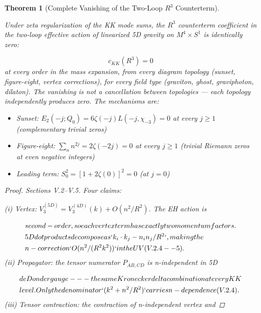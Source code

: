 \documentclass[aps,prd,preprint,superscriptaddress,longbibliography,floatfix]{revtex4-2}
\newtheorem{theorem}{Theorem}[section]
\theoremstyle{remark}
\begin{document}
\begin{theorem}[Complete Vanishing of the Two-Loop $R^{3}$ Counterterm]
\label{thm:V1}

\textit{Under zeta regularization of the KK mode sums, the $R^{3}$ counterterm coefficient in the two-loop effective action of linearized 5D gravity on $M^{4} \times S^{1}$ is identically zero:}


\begin{equation}
    c_{KK}(R^{3}) = 0
\end{equation}
\textit{at every order in the mass expansion, from every diagram topology (sunset, figure-eight, vertex corrections), for every field type (graviton, ghost, graviphoton, dilaton). The vanishing is not a cancellation between topologies --- each topology independently produces zero. The mechanisms are:}


\begin{itemize}
  \item \textit{Sunset: $E_{2}(-j; Q_{0}) = 6\zeta(-j)L(-j, \chi_{-3}) = 0$ at every $j \geq 1$ (complementary trivial zeros)}
  \item \textit{Figure-eight: $\sum_n n^{2j} = 2\zeta(-2j) = 0$ at every $j \geq 1$ (trivial Riemann zeros at even negative integers)}
  \item \textit{Leading term: $S_{0}^{2} = [1 + 2\zeta(0)]^{2} = 0$ (at $j = 0$)}
\end{itemize}

\begin{proof} Sections V.2--V.5. Four claims:

(i) Vertex: $V_{3}^{(5D)} = V_{3}^{(4D)}(k) + O(n^{2}/R^{2})$. The EH action is

\begin{align}
    & second-order, so each vertex term has exactly two momentum factors. \\
    & 5D dot products decompose as `k_i\cdot k_j - n_i n_j/R^{2}`, making the \\
    & n-correction `O(n^{2}/(R^{2}k^{2}))` in the UV (V.2.4--5).
\end{align}
(ii) Propagator: the tensor numerator $P_{AB,CD}$ is n-independent in 5D

\begin{align}
    & de Donder gauge --- the same Kronecker delta combination at every KK \\
    & level. Only the denominator `(k^{2} + n^{2}/R^{2})` carries n-dependence (V.2.4).
\end{align}
(iii) Tensor contraction: the contraction of n-independent vertex and


\end{proof}
\end{theorem}
\end{document}
